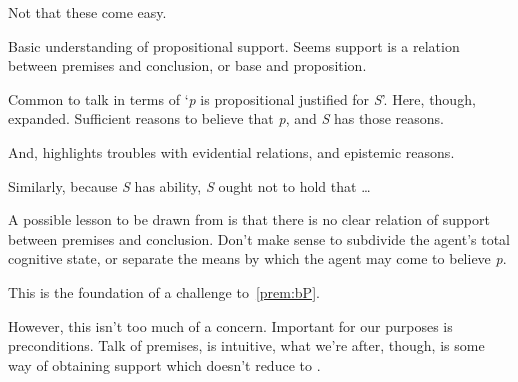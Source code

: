 \begin{note}
  Not that these come easy.

  Basic understanding of propositional support.
  Seems support is a relation between premises and conclusion, or base and proposition.

  Common to talk in terms of `\emph{p} is propositional justified for \emph{S}'.
  Here, though, expanded.
  Sufficient reasons to believe that \emph{p}, and \emph{S} has those reasons.

  And, \textcite{Silva:2020aa} highlights troubles with evidential relations, and epistemic reasons.

  Similarly, because \emph{S} has ability, \emph{S} ought not to hold that \dots
\end{note}

\begin{note}
  A possible lesson to be drawn from \citeauthor{Goldman:1979ui} is that there is no clear relation of support between premises and conclusion.
  Don't make sense to subdivide the agent's total cognitive state, or separate the means by which the agent may come to believe \emph{p}.

  This is the foundation of a challenge to~\ref{prem:bP}.

  However, this isn't too much of a concern.
  Important for our purposes is preconditions.
  Talk of premises, is intuitive, what we're after, though, is some way of obtaining support which doesn't reduce to \AR{}.
\end{note}

